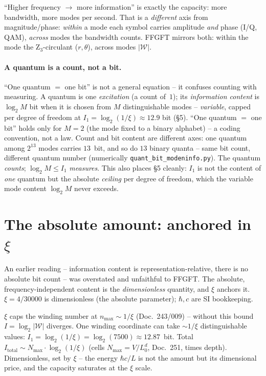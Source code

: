 \enquote{Higher frequency $\to$ more information} is exactly the capacity: more bandwidth, more modes per
second. That is a \emph{different} axis from magnitude/phase: \emph{within} a mode each symbol carries
amplitude \emph{and} phase (I/Q, QAM), \emph{across} modes the bandwidth counts. FFGFT mirrors both:
within the mode the Z$_3$-circulant ($r,\theta$), across modes $|\mathcal{W}|$.

\paragraph{A quantum is a count, not a bit.} \enquote{One quantum $=$ one bit} is not a general equation
-- it confuses counting with measuring. A quantum is one \emph{excitation} (a count of~$1$); its
\emph{information content} is $\log_2 M$ bit when it is chosen from $M$ distinguishable modes --
\emph{variable}, capped per degree of freedom at $I_1=\log_2(1/\xi)\approx12.9$ bit (§5). \enquote{One
quantum $=$ one bit} holds only for $M=2$ (the mode fixed to a binary alphabet) -- a coding convention,
not a law. Count and bit content are different axes: one quantum among $2^{13}$ modes carries $13$~bit,
and so do $13$ binary quanta -- same bit count, different quantum number (numerically
\texttt{quant\_bit\_modeninfo.py}). The quantum \emph{counts}; $\log_2 M\le I_1$ \emph{measures}. This
also places §5 cleanly: $I_1$ is not the content of \emph{one} quantum but the absolute \emph{ceiling} per
degree of freedom, which the variable mode content $\log_2 M$ never exceeds.

\section{The absolute amount: anchored in $\xi$}
An earlier reading -- information content is representation-relative, there is no absolute bit count --
was overstated and unfaithful to FFGFT. The absolute, frequency-independent content is the
\emph{dimensionless} quantity, and $\xi$ anchors it. $\xi=4/30000$ is dimensionless (the absolute
parameter); $\hbar,c$ are SI bookkeeping.

$\xi$ caps the winding number at $n_\text{max}\sim1/\xi$ (Doc.~243/009) -- without this bound
$I=\log_2|\mathcal{W}|$ diverges. One winding coordinate can take $\sim1/\xi$ distinguishable values:
$I_1=\log_2(1/\xi)=\log_2(7500)\approx12.87$~bit. Total
$I_\text{total}\sim N_\text{max}\cdot\log_2(1/\xi)$ (cells $N_\text{max}=V/L_0^{d}$, Doc.~251, times
depth). Dimensionless, set by $\xi$ -- the energy $\hbar c/L$ is not the amount but its dimensional price,
and the capacity saturates at the $\xi$ scale.

